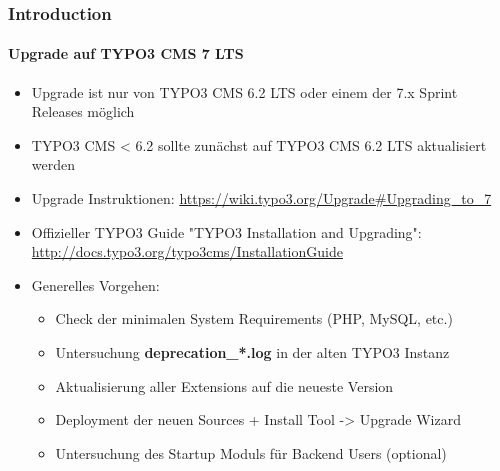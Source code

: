 \begin{frame}[fragile]
	\frametitle{Introduction}
	\framesubtitle{Upgrade auf TYPO3 CMS 7 LTS}

	\begin{itemize}
		\item Upgrade ist nur von TYPO3 CMS 6.2 LTS oder einem der 7.x Sprint Releases möglich
		\item TYPO3 CMS < 6.2 sollte zunächst auf TYPO3 CMS 6.2 LTS aktualisiert werden
	\end{itemize}

	\begin{itemize}

		\item Upgrade Instruktionen:\newline
			\smaller\url{https://wiki.typo3.org/Upgrade#Upgrading_to_7}\normalsize
		\item Offizieller TYPO3 Guide "TYPO3 Installation and Upgrading":
			\smaller\url{http://docs.typo3.org/typo3cms/InstallationGuide}\normalsize
		\item Generelles Vorgehen:
			\begin{itemize}
				\item Check der minimalen System Requirements \small(PHP, MySQL, etc.)
				\item Untersuchung \textbf{deprecation\_*.log} in der alten TYPO3 Instanz
				\item Aktualisierung aller Extensions auf die neueste Version
				\item Deployment der neuen Sources + Install Tool -> Upgrade Wizard
				\item Untersuchung des Startup Moduls für Backend Users (optional)
			\end{itemize}
	\end{itemize}

\end{frame}

